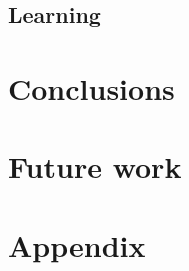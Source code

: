 \documentclass[11pt]{article} \usepackage{fullpage} \usepackage{cite}
\begin{document}
\subsection{Learning}



\section{Conclusions}




\section{Future work}

\section{Appendix}

\end{document}
